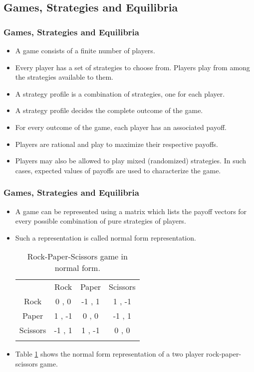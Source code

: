 \documentclass{beamer}
\begin{document}
\subsection*{Games, Strategies and Equilibria}
\begin{frame}
 \frametitle{Games, Strategies and Equilibria}
\begin{itemize}
	\item A game consists of a finite number of players.
	\item Every player has a set of strategies to choose from. Players play from among the strategies available to them.
	\item A strategy profile is a combination of strategies, one for each player.
	\item A strategy profile decides the complete outcome of the game.
	\item For every outcome of the game, each player has an associated payoff.
	\item Players are rational and play to maximize their respective payoffs.
	\item Players may also be allowed to play mixed (randomized) strategies. In such cases, expected values of payoffs are used to characterize the game.
\end{itemize}
\end{frame}

\begin{frame}
 \frametitle{Games, Strategies and Equilibria}
\begin{itemize}
	\item A game can be represented using a matrix which lists the payoff vectors for every possible combination of pure strategies of players.
	\item Such a representation is called normal form representation.
\begin{table}[h]
\centering
\caption{Rock-Paper-Scissors game in normal form.}
\label{table:rps}
\begin{tabular}{c c c c}
\hline\noalign{\smallskip}
         & Rock   & Paper  & Scissors \\ \noalign{\smallskip}\hline\noalign{\smallskip}
Rock     & 0 , 0  & -1 , 1 & 1 , -1   \\
Paper    & 1 , -1 & 0 , 0  & -1 , 1   \\
Scissors & -1 , 1 & 1 , -1 & 0 , 0    \\ \noalign{\smallskip}\hline
\end{tabular}
\end{table}
	\item Table \ref{table:rps} shows the normal form representation of a two player rock-paper-scissors game.
\end{itemize}
\end{frame}
\end{document}
